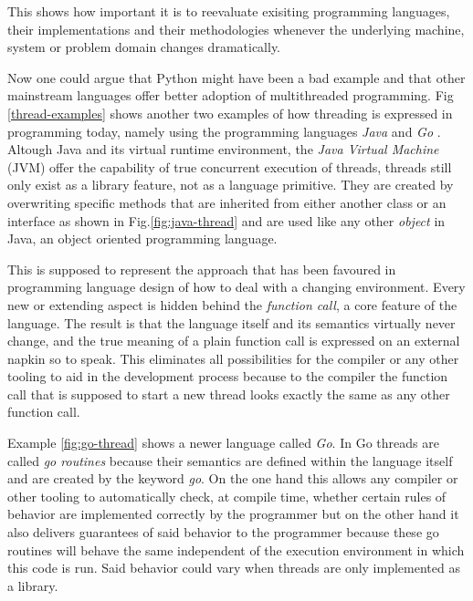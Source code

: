 This shows how important it is to reevaluate exisiting programming
languages, their implementations and their methodologies whenever the
underlying machine, system or problem domain changes dramatically.
\newline

Now one could argue that Python might have been a bad example and
that other mainstream languages offer better adoption of
multithreaded programming. Fig \ref{thread-examples}
shows another two examples of how threading is expressed in programming today,
namely using the programming languages \textit{Java} \cite{java} and
\textit{Go} \cite{golang}. Altough Java and its virtual runtime environment, the
\textit{Java Virtual Machine} (JVM) offer the capability of true
concurrent execution of threads,  threads still only exist as a library
feature, not as a language primitive. They are created by overwriting
specific methods that are inherited from either another class or an
interface as shown in Fig.\ref{fig:java-thread} and are used like any other
\textit{object}
in Java, an object oriented programming language.

This is supposed to represent the approach that
has been favoured in programming language design of how to deal with
a changing environment. Every new or extending aspect is hidden behind
the \textit{function call}, a core feature of the language. The result is
that the language itself and its semantics virtually never change, and
the true meaning of a plain function call is expressed on an external
napkin so to speak. This eliminates all possibilities for the compiler
or any other tooling to aid in the development process because to the
compiler the function call that is supposed to start a new thread
looks exactly the same as any other function call.
\newline

Example \ref{fig:go-thread} shows a newer language called \textit{Go}.
In Go threads are called \textit{go routines} because their semantics
are defined within the language itself and are created by the keyword
\textit{go}. On the one hand this allows
any compiler or other tooling to automatically check, at compile time,
whether certain rules of behavior are implemented correctly by the
programmer but on the other hand it also delivers guarantees of said
behavior to the programmer because these go routines will behave the
same independent of the execution environment in which this code is run.
Said behavior could vary when threads are only implemented as a library.

